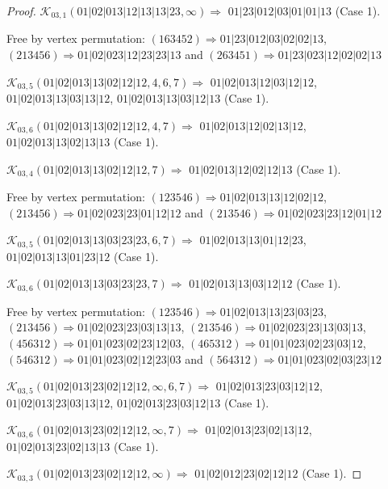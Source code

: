 \documentclass[12pt]{article}
\theoremstyle{plain}
\theoremstyle{definition}
\theoremstyle{remark}
\newcommand{\fancy}[1]{\mathcal{#1}}
\def\K{\fancy{K}}
\begin{document}
\begin{proof}
	$\K_{03,1}(01|02|013|12|13|13|23,\infty)\Rightarrow $ $01|23|012|03|01|01|13$ (Case 1).
	
	
	
	Free by vertex permutation: $(1 6 3 4 5 2)\Rightarrow 01|23|012|03|02|02|13$, $(2 1 3 4 5 6)\Rightarrow 01|02|023|12|23|23|13$ and $(2 6 3 4 5 1)\Rightarrow 01|23|023|12|02|02|13$
	
	
	
	\bigskip
	
	$\K_{03,5}(01|02|013|13|02|12|12,4, 6, 7)\Rightarrow $ $01|02|013|12|03|12|12$, $01|02|013|13|03|13|12$, $01|02|013|13|03|12|13$ (Case 1).
	
	$\K_{03,6}(01|02|013|13|02|12|12,4, 7)\Rightarrow $ $01|02|013|12|02|13|12$, $01|02|013|13|02|13|13$ (Case 1).
	
	$\K_{03,4}(01|02|013|13|02|12|12,7)\Rightarrow $ $01|02|013|12|02|12|13$ (Case 1).
	
	
	
	Free by vertex permutation: $(1 2 3 5 4 6)\Rightarrow 01|02|013|13|12|02|12$, $(2 1 3 4 5 6)\Rightarrow 01|02|023|23|01|12|12$ and $(2 1 3 5 4 6)\Rightarrow 01|02|023|23|12|01|12$
	
	
	
	\bigskip
	
	$\K_{03,5}(01|02|013|13|03|23|23,6, 7)\Rightarrow $ $01|02|013|13|01|12|23$, $01|02|013|13|01|23|12$ (Case 1).
	
	$\K_{03,6}(01|02|013|13|03|23|23,7)\Rightarrow $ $01|02|013|13|03|12|12$ (Case 1).
	
	
	
	Free by vertex permutation: $(1 2 3 5 4 6)\Rightarrow 01|02|013|13|23|03|23$, $(2 1 3 4 5 6)\Rightarrow 01|02|023|23|03|13|13$, $(2 1 3 5 4 6)\Rightarrow 01|02|023|23|13|03|13$, $(4 5 6 3 1 2)\Rightarrow 01|01|023|02|23|12|03$, $(4 6 5 3 1 2)\Rightarrow 01|01|023|02|23|03|12$, $(5 4 6 3 1 2)\Rightarrow 01|01|023|02|12|23|03$ and $(5 6 4 3 1 2)\Rightarrow 01|01|023|02|03|23|12$
	
	
	
	\bigskip
	
	$\K_{03,5}(01|02|013|23|02|12|12,\infty,6, 7)\Rightarrow $ $01|02|013|23|03|12|12$, $01|02|013|23|03|13|12$, $01|02|013|23|03|12|13$ (Case 1).
	
	$\K_{03,6}(01|02|013|23|02|12|12,\infty,7)\Rightarrow $ $01|02|013|23|02|13|12$, $01|02|013|23|02|13|13$ (Case 1).
	
	$\K_{03,3}(01|02|013|23|02|12|12,\infty)\Rightarrow $ $01|02|012|23|02|12|12$ (Case 1).
	

\end{proof}
\end{document}
